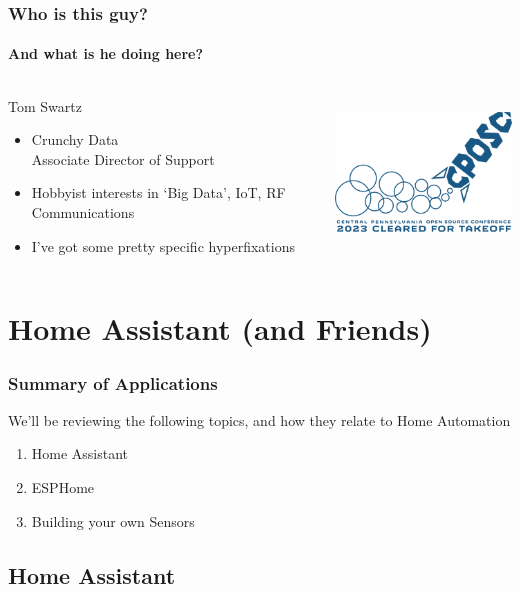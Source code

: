 \documentclass[aspectratio=169]{beamer}
\begin{document}
\begin{frame}
  \frametitle{Who is this guy?}
  \framesubtitle{And what is he doing here?}
  \begin{columns}[]
    \begin{column}[T]{0.45\paperwidth}
      {\huge Tom Swartz}
      \vfill
      \begin{itemize}[<+->]
        \item{Crunchy Data \\ Associate Director of Support} 
        \item{Hobbyist interests in `Big Data', IoT, RF Communications}
        \item{I've got some pretty specific hyperfixations}
      \end{itemize}
    \end{column}
    \begin{column}[T]{0.45\paperwidth}
      \includegraphics[height=4cm,keepaspectratio]{images/logo.png}
    \end{column}
  \end{columns}
\end{frame}

\section{Home Assistant (and Friends)}
\frame{\sectionpage}

\begin{frame}
  \frametitle{Summary of Applications}
  We'll be reviewing the following topics, and how they relate to Home Automation
  \begin{enumerate}
    \item{Home Assistant}
    \item{ESPHome}
    \item{Building your own Sensors}
  \end{enumerate}
\end{frame}

\subsection{Home Assistant}
\frame{\subsectionpage}
\end{document}
